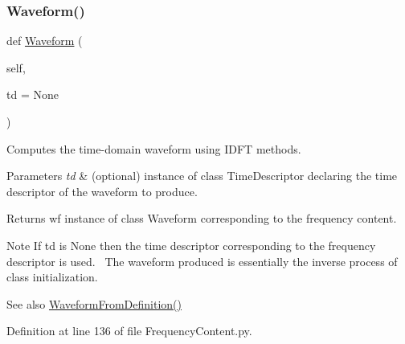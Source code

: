 \subsubsection{\texorpdfstring{Waveform()}{Waveform()}}
{\footnotesize\ttfamily def \hyperlink{classSignalIntegrity_1_1TimeDomain_1_1Waveform_1_1Waveform_1_1Waveform}{Waveform} (\begin{DoxyParamCaption}\item[{}]{self,  }\item[{}]{td = {\ttfamily None} }\end{DoxyParamCaption})}



Computes the time-\/domain waveform using I\+D\+FT methods. 


\begin{DoxyParams}{Parameters}
{\em td} & (optional) instance of class Time\+Descriptor declaring the time descriptor of the waveform to produce. \\
\hline
\end{DoxyParams}
\begin{DoxyReturn}{Returns}
wf instance of class Waveform corresponding to the frequency content. 
\end{DoxyReturn}
\begin{DoxyNote}{Note}
If td is None then the time descriptor corresponding to the frequency descriptor is used.~\newline
 The waveform produced is essentially the inverse process of class initialization.~\newline
 
\end{DoxyNote}
\begin{DoxySeeAlso}{See also}
\hyperlink{classSignalIntegrity_1_1FrequencyDomain_1_1FrequencyContent_1_1FrequencyContent_a8dfcef6517e6699a8b78a2bf9c796230}{Waveform\+From\+Definition()} 
\end{DoxySeeAlso}


Definition at line 136 of file Frequency\+Content.\+py.

\mbox{\label{classSignalIntegrity_1_1FrequencyDomain_1_1FrequencyContent_1_1FrequencyContent_a8dfcef6517e6699a8b78a2bf9c796230}} 
